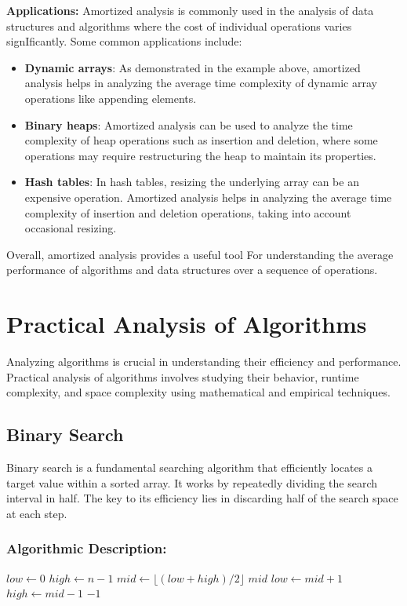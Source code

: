 \documentclass[12pt]{book} %
\begin{document}
\FloatBarrier
\textbf{Applications:}
\FloatBarrier
Amortized analysis is commonly used in the analysis of data structures and algorithms where the cost of individual operations varies signIficantly. Some common applications include:

\begin{itemize}
    \item \textbf{Dynamic arrays}: As demonstrated in the example above, amortized analysis helps in analyzing the average time complexity of dynamic array operations like appending elements.
    
    \item \textbf{Binary heaps}: Amortized analysis can be used to analyze the time complexity of heap operations such as insertion and deletion, where some operations may require restructuring the heap to maintain its properties.
    
    \item \textbf{Hash tables}: In hash tables, resizing the underlying array can be an expensive operation. Amortized analysis helps in analyzing the average time complexity of insertion and deletion operations, taking into account occasional resizing.
\end{itemize}

Overall, amortized analysis provides a useful tool For understanding the average performance of algorithms and data structures over a sequence of operations.

\section{Practical Analysis of Algorithms}
Analyzing algorithms is crucial in understanding their efficiency and performance. Practical analysis of algorithms involves studying their behavior, runtime complexity, and space complexity using mathematical and empirical techniques.
\subsection{Binary Search}
Binary search is a fundamental searching algorithm that efficiently locates a target value within a sorted array. It works by repeatedly dividing the search interval in half. The key to its efficiency lies in discarding half of the search space at each step.
\subsubsection{Algorithmic Description:}
\begin{algorithm}
\caption{Binary Search}
\begin{algorithmic}[1]
\State $low \gets 0$
\State $high \gets n - 1$
    \State $mid \gets \lfloor(low + high) / 2 \rfloor$
        \State \Return $mid$
        \State $low \gets mid + 1$
    \Else
        \State $high \gets mid - 1$
    \EndIf
\EndWhile
\State \Return $-1$ 
\EndFunction
\end{algorithmic}
\end{algorithm}
\end{document}
